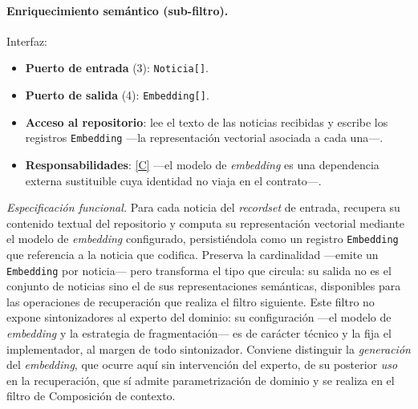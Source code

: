 \documentclass[12pt]{report}
\DeclareRobustCommand{\resp}[1]{\hyperref[tab:registro-responsabilidades]{\textcolor{respcolor}{[#1]}}}
\begin{document}
\paragraph{Enriquecimiento semántico (sub-filtro).} Interfaz:
\begin{itemize}
  \item \textbf{Puerto de entrada} (3): \texttt{Noticia[]}.
  \item \textbf{Puerto de salida} (4): \texttt{Embedding[]}.
  \item \textbf{Acceso al repositorio}: lee el texto de las noticias recibidas y escribe los registros \texttt{Embedding} ---la representación vectorial asociada a cada una---.
  \item \textbf{Responsabilidades}: \resp{C} ---el modelo de \textit{embedding} es una dependencia externa sustituible cuya identidad no viaja en el contrato---.
\end{itemize}
\textit{Especificación funcional.} Para cada noticia del \textit{recordset} de entrada, recupera su contenido textual del repositorio y computa su representación vectorial mediante el modelo de \textit{embedding} configurado, persistiéndola como un registro \texttt{Embedding} que referencia a la noticia que codifica. Preserva la cardinalidad ---emite un \texttt{Embedding} por noticia--- pero transforma el tipo que circula: su salida no es el conjunto de noticias sino el de sus representaciones semánticas, disponibles para las operaciones de recuperación que realiza el filtro siguiente. Este filtro no expone sintonizadores al experto del dominio: su configuración ---el modelo de \textit{embedding} y la estrategia de fragmentación--- es de carácter técnico y la fija el implementador, al margen de todo sintonizador. Conviene distinguir la \textit{generación} del \textit{embedding}, que ocurre aquí sin intervención del experto, de su posterior \textit{uso} en la recuperación, que sí admite parametrización de dominio y se realiza en el filtro de Composición de contexto.
\end{document}
